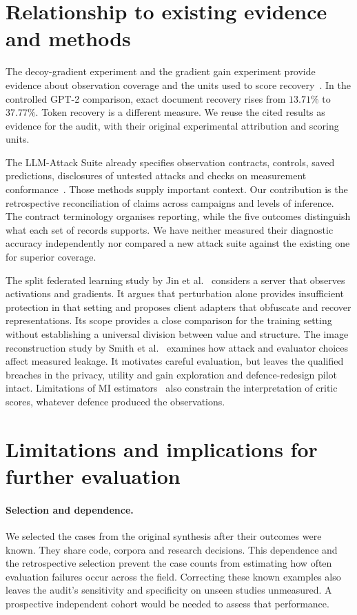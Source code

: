 \section{Relationship to existing evidence and methods}
\label{sec:related}

The decoy-gradient experiment and the gradient gain experiment provide
evidence about observation coverage and the units used to score
recovery~\cite{paper1,gradients2026}. In the controlled GPT-2 comparison,
exact document recovery rises from $13.71\%$ to $37.77\%$. Token recovery
is a different measure. We reuse the cited results as evidence for the
audit, with their original experimental attribution and scoring units.

The LLM-Attack Suite already specifies observation contracts, controls,
saved predictions, disclosures of untested attacks and checks on measurement
conformance~\cite{suite2026}. Those methods supply important context.
Our contribution is the retrospective reconciliation of claims across
campaigns and levels of inference. The contract terminology organises
reporting, while the five outcomes distinguish what each set of records
supports. We have neither measured their diagnostic accuracy independently
nor compared a new attack suite against the existing one for superior
coverage.

The split federated learning study by Jin et al.~\cite{privpair2026} considers a
server that observes activations and gradients. It argues that perturbation
alone provides insufficient protection in that setting and proposes
client adapters that obfuscate and recover representations. Its scope
provides a close comparison for the training setting without establishing
a universal division between value and structure. The image reconstruction
study by Smith et al.~\cite{mia2026} examines how attack and evaluator choices affect
measured leakage. It motivates careful evaluation, but leaves the qualified
breaches in the privacy, utility and gain exploration and defence-redesign
pilot intact. Limitations of MI estimators~\cite{mcallester2020,song2020}
also constrain the interpretation of critic scores, whatever defence
produced the observations.

\section{Limitations and implications for further evaluation}
\label{sec:limits}

\paragraph{Selection and dependence.}
We selected the cases from the original synthesis after their outcomes
were known. They share code, corpora and research decisions. This
dependence and the retrospective selection prevent the case counts from
estimating how often evaluation failures occur across the field.
Correcting these known examples also leaves the audit's sensitivity and
specificity on unseen studies unmeasured. A prospective independent cohort
would be needed to assess that performance.

